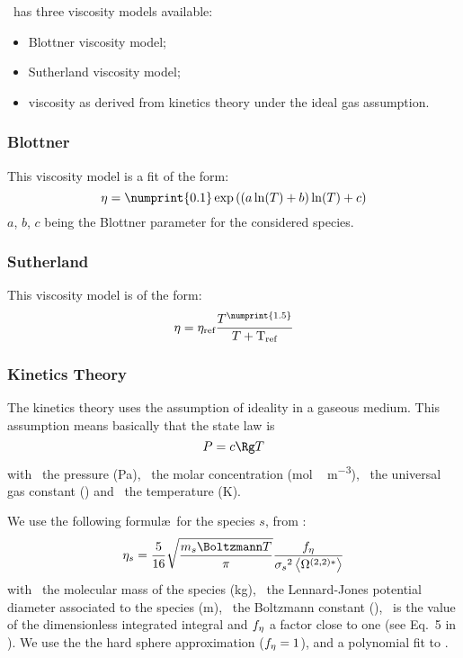 \Antioch\ has three viscosity models available:
\begin{itemize}
\item Blottner viscosity model;
\item Sutherland viscosity model;
\item viscosity as derived from kinetics theory under the ideal gas assumption.
\end{itemize}

\subsubsection{Blottner}
\label{transport:viscosity:blottner}

This viscosity model is a fit of the form:
\begin{equation}
\vis = \numprint{0.1} \exp\left((a \ln(\Temp) + b) \ln(\Temp) + c\right)
\label{blottner:eq}
\end{equation}
$a$, $b$, $c$ being the Blottner parameter for the considered
species.

\subsubsection{Sutherland}
\label{transport:viscosity:sutherland}

This viscosity model is of the form:
\begin{equation}
\vis = \vis_\text{ref} \frac{\Temp^{\numprint{1.5}}}{\Temp + \text{T}_\text{ref}}
\label{sutherland:eq}
\end{equation}

\subsubsection{Kinetics Theory}
\label{transport:viscosity:kin_theo}

The kinetics theory uses the assumption of ideality in a 
gaseous medium. This assumption means basically that the
state law is
\begin{equation}
\Press = \conc\Rg \Temp
\end{equation}
with \Press\ the pressure (\unit{Pa}), \conc\ the molar concentration
(\unit{mol\,m^{-3}}), \Rg\ the universal gas constant (\RgEquation)
and \Temp\ the temperature (\unit{K}).

We use the following formul\ae\ for the species $s$, from \citet{Monchick1961}:
\begin{equation}
\vis[s] = \frac{5}{16} \sqrt{\frac{\Mass[s]\Boltzmann\Temp}{\pi}}\frac{f_{\vis}}{\LJdia[s]^2\Stockmayer{2}}
\label{visc_kin_theory:eq}
\end{equation}
with \Mass\ the molecular mass of the species (\unit{kg}), \LJdia\ the Lennard-Jones
potential diameter associated to the species (\unit{m}), \Boltzmann\ the Boltzmann
constant (\BoltzmannEquation), \ is the
value of the dimensionless integrated integral and $f_{\vis}$ a factor close
to one (see Eq.~5 in \citet{Monchick1961}). We use the 
the hard sphere approximation ($f_{\vis} = 1$), and a polynomial fit to .
